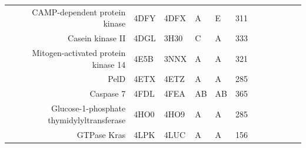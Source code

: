 \begin{table}
\begin{scriptsize}
\begin{tabular}{ r p{0.8cm} p{0.8cm} p{0.8cm} p{0.8cm} r r r r r r r }
\multicolumn{1}{r}{CAMP-dependent protein kinase} & \multicolumn{1}{l}{4DFY} & \multicolumn{1}{l}{4DFX} & \multicolumn{1}{l}{A} & \multicolumn{1}{l}{E} & 311   & \cellcolor[rgb]{ .573,  .816,  .314}  & \cellcolor[rgb]{ .573,  .816,  .314}  & \cellcolor[rgb]{ 1,  .494,  .475}  & \cellcolor[rgb]{ 1,  .494,  .475}  & \cellcolor[rgb]{ .573,  .816,  .314}  & \cellcolor[rgb]{ .573,  .816,  .314}  \\
\multicolumn{1}{r}{Casein kinase II} & \multicolumn{1}{l}{4DGL} & \multicolumn{1}{l}{3H30} & \multicolumn{1}{l}{C} & \multicolumn{1}{l}{A} & 333   & \cellcolor[rgb]{ .573,  .816,  .314}  & \cellcolor[rgb]{ 1,  .494,  .475}  & \cellcolor[rgb]{ 1,  .494,  .475}  & \cellcolor[rgb]{ .573,  .816,  .314}  & \cellcolor[rgb]{ 1,  .494,  .475}  & \cellcolor[rgb]{ .573,  .816,  .314}  \\
\multicolumn{1}{r}{Mitogen-activated protein kinase 14} & \multicolumn{1}{l}{4E5B} & \multicolumn{1}{l}{3NNX} & \multicolumn{1}{l}{A} & \multicolumn{1}{l}{A} & 321   & \cellcolor[rgb]{ .573,  .816,  .314}  & \cellcolor[rgb]{ 1,  .494,  .475}  & \cellcolor[rgb]{ 1,  .494,  .475}  & \cellcolor[rgb]{ .573,  .816,  .314}  & \cellcolor[rgb]{ .573,  .816,  .314}  & \cellcolor[rgb]{ .573,  .816,  .314}  \\
\multicolumn{1}{r}{PelD} & \multicolumn{1}{l}{4ETX} & \multicolumn{1}{l}{4ETZ} & \multicolumn{1}{l}{A} & \multicolumn{1}{l}{A} & 285   & \cellcolor[rgb]{ 1,  .494,  .475}  & \cellcolor[rgb]{ 1,  .494,  .475}  & \cellcolor[rgb]{ .573,  .816,  .314}  & \cellcolor[rgb]{ 1,  .494,  .475}  & \cellcolor[rgb]{ 1,  .494,  .475}  & \cellcolor[rgb]{ 1,  .494,  .475}  \\
\multicolumn{1}{r}{Caspase 7} & \multicolumn{1}{l}{4FDL} & \multicolumn{1}{l}{4FEA} & \multicolumn{1}{l}{AB} & \multicolumn{1}{l}{AB} & 365   & \cellcolor[rgb]{ 1,  .494,  .475}  & \cellcolor[rgb]{ .573,  .816,  .314}  & \cellcolor[rgb]{ .573,  .816,  .314}  & \cellcolor[rgb]{ 1,  .494,  .475}  & \cellcolor[rgb]{ .573,  .816,  .314}  & \cellcolor[rgb]{ 1,  .494,  .475}  \\
\multicolumn{1}{r}{Glucose-1-phosphate thymidylyltransferase} & \multicolumn{1}{l}{4HO0} & \multicolumn{1}{l}{4HO9} & \multicolumn{1}{l}{A} & \multicolumn{1}{l}{A} & 285   & \cellcolor[rgb]{ .573,  .816,  .314}  & \cellcolor[rgb]{ .573,  .816,  .314}  & \cellcolor[rgb]{ 1,  .494,  .475}  & \cellcolor[rgb]{ 1,  .494,  .475}  & \cellcolor[rgb]{ .573,  .816,  .314}  & \cellcolor[rgb]{ 1,  .494,  .475}  \\
\multicolumn{1}{r}{GTPase Kras} & \multicolumn{1}{l}{4LPK} & \multicolumn{1}{l}{4LUC} & \multicolumn{1}{l}{A} & \multicolumn{1}{l}{A} & 156   & \cellcolor[rgb]{ .573,  .816,  .314}  & \cellcolor[rgb]{ .573,  .816,  .314}  & \cellcolor[rgb]{ 1,  1,  0}  & \cellcolor[rgb]{ .573,  .816,  .314}  & \cellcolor[rgb]{ .573,  .816,  .314}  & \cellcolor[rgb]{ .573,  .816,  .314}  \\

\end{tabular}
\end{scriptsize}
\end{table}
